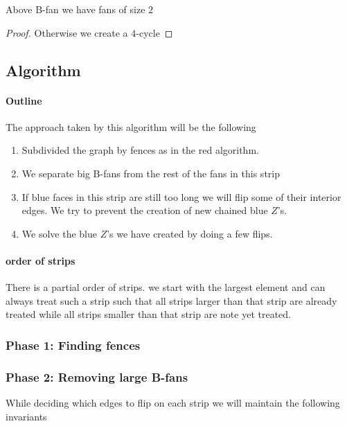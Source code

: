   \begin{lemma}
    \label{lm:}
    Above B-fan we have fans of size $2$
  \end{lemma}
  \begin{proof}
    Otherwise we create a $4$-cycle
  \end{proof}


\subsection{Algorithm}

\paragraph{Outline}
The approach taken by this algorithm will be the following
\begin{enumerate}
  \item Subdivided the graph by fences as in the red algorithm.
  \item We separate big B-fans from the rest of the fans in this strip
  \item If blue faces  in this strip are still too long we will flip some of their interior edges. We try to prevent the creation of new chained blue $Z$'s.
  \item We solve the blue $Z$'s we have created by doing a few flips.
\end{enumerate}

\paragraph{order of strips}
There is a partial order of strips. we start with the largest element and can always treat such a strip such that all strips larger than that strip are already treated while all strips smaller than that strip are note yet treated.




\subsubsection{Phase 1: Finding fences}


\subsubsection{Phase 2: Removing large B-fans}

While deciding which edges to flip on each strip we will maintain the following invariants

